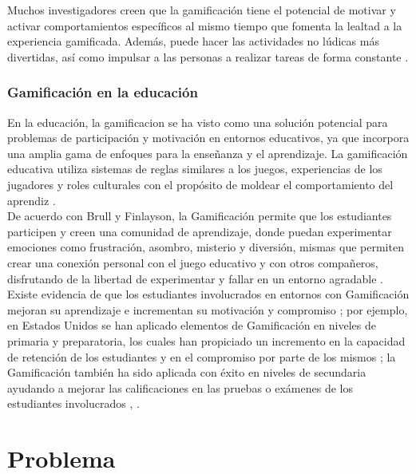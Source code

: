  \noindent Muchos investigadores creen que la gamificación tiene el potencial de
 motivar y activar comportamientos específicos al mismo tiempo que fomenta la
 lealtad a la experiencia gamificada. Además, puede hacer las actividades no
 lúdicas más divertidas, así como impulsar a las personas a realizar tareas
 de forma constante \cite{Aldemir}.

 \clearpage


\subsubsection{Gamificación en la educación}

 En la educación, la \gls{gamificacion} se ha visto como una solución potencial
 para problemas de participación y motivación en entornos educativos, ya que
 incorpora una amplia gama de enfoques para la enseñanza y el aprendizaje.
 La gamificación educativa utiliza sistemas de reglas similares a los juegos,
 experiencias de los jugadores y roles culturales con el propósito de moldear
 el comportamiento del aprendiz \cite{Aldemir}.\\

 \noindent De acuerdo con Brull y Finlayson, la Gamificación permite que los
 estudiantes participen y creen una comunidad de aprendizaje, donde puedan experimentar
 emociones como frustración, asombro, misterio y diversión, mismas que permiten
 crear una conexión personal con el juego educativo y con otros compañeros,
 disfrutando de la libertad de experimentar y fallar en un entorno agradable
 \cite{BrullFinlayson}.\\

 \noindent Existe evidencia de que los estudiantes involucrados en entornos con
 Gamificación mejoran su aprendizaje e incrementan su motivación y compromiso
 \cite{ChuHung}; por ejemplo, en Estados Unidos se han aplicado elementos de
 Gamificación en niveles de primaria y preparatoria, los cuales han propiciado
 un incremento en la capacidad de retención de los estudiantes y en el compromiso por
 parte de los mismos \cite{BrullFinlayson}; la Gamificación también ha sido aplicada
 con éxito en niveles de secundaria ayudando a mejorar las calificaciones en las
 pruebas o exámenes de los estudiantes involucrados \cite{UPIICSA}, \cite{Admiraal}.

\section{Problema} \label{sec:problematica}

